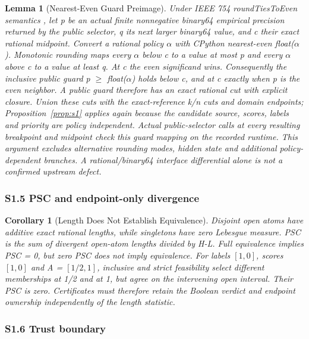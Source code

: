 \documentclass[11pt,a4paper]{article}
\theoremstyle{plain}
\newtheorem{lemma}[proposition]{Lemma}
\newtheorem{corollary}[proposition]{Corollary}
\theoremstyle{definition}
\theoremstyle{remark}
\begin{document}
\begin{lemma}[Nearest-Even Guard Preimage]\label{lem:s6}
Under IEEE 754 roundTiesToEven semantics \cite{ieee2019floating}, let p be an actual finite nonnegative binary64 empirical precision returned by the public selector, q its next larger binary64 value, and c their exact rational midpoint. Convert a rational policy $\alpha$ with CPython nearest-even float($\alpha$). Monotonic rounding maps every $\alpha$ below c to a value at most p and every $\alpha$ above c to a value at least q. At c the even significand wins. Consequently the inclusive public guard p $\ge$ float($\alpha$) holds below c, and at c exactly when p is the even neighbor. A public guard therefore has an exact rational cut with explicit closure. Union these cuts with the exact-reference k/n cuts and domain endpoints; Proposition~\ref{prop:s1} applies again because the candidate source, scores, labels and priority are policy independent. Actual public-selector calls at every resulting breakpoint and midpoint check this guard mapping on the recorded runtime. This argument excludes alternative rounding modes, hidden state and additional policy-dependent branches. A rational/binary64 interface differential alone is not a confirmed upstream defect.
\end{lemma}

\subsubsection*{S1.5 PSC and endpoint-only divergence}\label{sec:s1_5}

\begin{corollary}[Length Does Not Establish Equivalence]\label{cor:s7}
Disjoint open atoms have additive exact rational lengths, while singletons have zero Lebesgue measure. PSC is the sum of divergent open-atom lengths divided by H-L. Full equivalence implies PSC = 0, but zero PSC does not imply equivalence. For labels $[1, 0]$, scores $[1, 0]$ and A = $[1/2, 1]$, inclusive and strict feasibility select different memberships at 1/2 and at 1, but agree on the intervening open interval. Their PSC is zero. Certificates must therefore retain the Boolean verdict and endpoint ownership independently of the length statistic.
\end{corollary}

\subsubsection*{S1.6 Trust boundary}\label{sec:s1_6}
\end{document}
